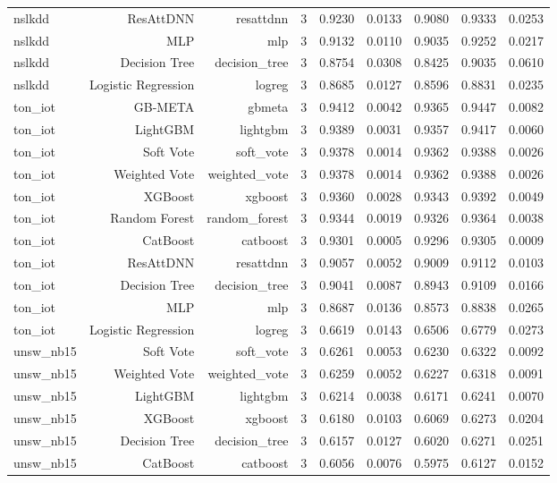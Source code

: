 \begin{table}[t]
{\begin{tabular}{lrrrrrrrr}
nslkdd & ResAttDNN & resattdnn & 3 & 0.9230 & 0.0133 & 0.9080 & 0.9333 & 0.0253 \\
nslkdd & MLP & mlp & 3 & 0.9132 & 0.0110 & 0.9035 & 0.9252 & 0.0217 \\
nslkdd & Decision Tree & decision_tree & 3 & 0.8754 & 0.0308 & 0.8425 & 0.9035 & 0.0610 \\
nslkdd & Logistic Regression & logreg & 3 & 0.8685 & 0.0127 & 0.8596 & 0.8831 & 0.0235 \\
ton_iot & GB-META & gbmeta & 3 & 0.9412 & 0.0042 & 0.9365 & 0.9447 & 0.0082 \\
ton_iot & LightGBM & lightgbm & 3 & 0.9389 & 0.0031 & 0.9357 & 0.9417 & 0.0060 \\
ton_iot & Soft Vote & soft_vote & 3 & 0.9378 & 0.0014 & 0.9362 & 0.9388 & 0.0026 \\
ton_iot & Weighted Vote & weighted_vote & 3 & 0.9378 & 0.0014 & 0.9362 & 0.9388 & 0.0026 \\
ton_iot & XGBoost & xgboost & 3 & 0.9360 & 0.0028 & 0.9343 & 0.9392 & 0.0049 \\
ton_iot & Random Forest & random_forest & 3 & 0.9344 & 0.0019 & 0.9326 & 0.9364 & 0.0038 \\
ton_iot & CatBoost & catboost & 3 & 0.9301 & 0.0005 & 0.9296 & 0.9305 & 0.0009 \\
ton_iot & ResAttDNN & resattdnn & 3 & 0.9057 & 0.0052 & 0.9009 & 0.9112 & 0.0103 \\
ton_iot & Decision Tree & decision_tree & 3 & 0.9041 & 0.0087 & 0.8943 & 0.9109 & 0.0166 \\
ton_iot & MLP & mlp & 3 & 0.8687 & 0.0136 & 0.8573 & 0.8838 & 0.0265 \\
ton_iot & Logistic Regression & logreg & 3 & 0.6619 & 0.0143 & 0.6506 & 0.6779 & 0.0273 \\
unsw_nb15 & Soft Vote & soft_vote & 3 & 0.6261 & 0.0053 & 0.6230 & 0.6322 & 0.0092 \\
unsw_nb15 & Weighted Vote & weighted_vote & 3 & 0.6259 & 0.0052 & 0.6227 & 0.6318 & 0.0091 \\
unsw_nb15 & LightGBM & lightgbm & 3 & 0.6214 & 0.0038 & 0.6171 & 0.6241 & 0.0070 \\
unsw_nb15 & XGBoost & xgboost & 3 & 0.6180 & 0.0103 & 0.6069 & 0.6273 & 0.0204 \\
unsw_nb15 & Decision Tree & decision_tree & 3 & 0.6157 & 0.0127 & 0.6020 & 0.6271 & 0.0251 \\
unsw_nb15 & CatBoost & catboost & 3 & 0.6056 & 0.0076 & 0.5975 & 0.6127 & 0.0152 \\

\end{tabular}}
\end{table}
